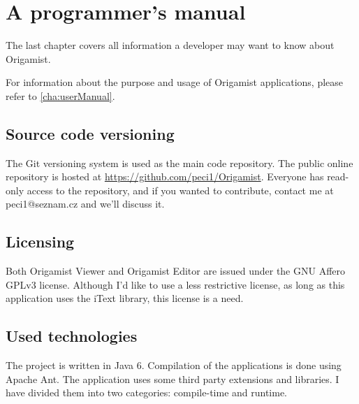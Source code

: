 \chapter{A programmer's manual}

The last chapter covers all information a developer may want to know about Origamist.

For information about the purpose and usage of Origamist applications, please refer to \ref{cha:userManual}.

\section{Source code versioning}
The Git versioning system is used as the main code repository. The public online repository is hosted at \url{https://github.com/peci1/Origamist}. Everyone has read-only access to the repository, and if you wanted to contribute, contact me at peci1@seznam.cz and we'll discuss it.

\section{Licensing}
Both Origamist Viewer and Origamist Editor are issued under the GNU Affero GPLv3 license. Although I'd like to use a less restrictive license, as long as this application uses the iText library, this license is a need.

\section{Used technologies}
\label{sec:technologies}
The project is written in Java 6. Compilation of the applications is done using Apache Ant. The application uses some third party extensions and libraries. I have divided them into two categories: compile-time and runtime.

